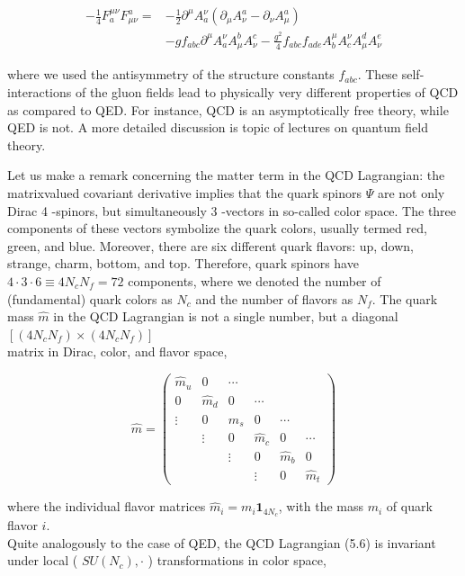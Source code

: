 \documentclass[10pt, letterpaper]{article}
\begin{document}
$$
\begin{aligned}
-\frac{1}{4} F_{a}^{\mu \nu} F_{\mu \nu}^{a}= & -\frac{1}{2} \partial^{\mu} A_{a}^{\nu}\left(\partial_{\mu} A_{\nu}^{a}-\partial_{\nu} A_{\mu}^{a}\right) \\
& -g f_{a b c} \partial^{\mu} A_{a}^{\nu} A_{\mu}^{b} A_{\nu}^{c}-\frac{g^{2}}{4} f_{a b c} f_{a d e} A_{b}^{\mu} A_{c}^{\nu} A_{\mu}^{d} A_{\nu}^{e}
\end{aligned}
$$

where we used the antisymmetry of the structure constants $f_{a b c}$. These self-interactions of the gluon fields lead to physically very different properties of QCD as compared to QED. For instance, QCD is an asymptotically free theory, while QED is not. A more detailed discussion is topic of lectures on quantum field theory.

Let us make a remark concerning the matter term in the QCD Lagrangian: the matrixvalued covariant derivative implies that the quark spinors $\Psi$ are not only Dirac 4 -spinors, but simultaneously 3 -vectors in so-called color space. The three components of these vectors symbolize the quark colors, usually termed red, green, and blue. Moreover, there are six different quark flavors: up, down, strange, charm, bottom, and top. Therefore, quark spinors have $4 \cdot 3 \cdot 6 \equiv 4 N_{c} N_{f}=72$ components, where we denoted the number of (fundamental) quark colors as $N_{c}$ and the number of flavors as $N_{f}$. The quark mass $\hat{m}$ in the QCD Lagrangian is not a single number, but a diagonal $\left[\left(4 N_{c} N_{f}\right) \times\left(4 N_{c} N_{f}\right)\right]$\\
matrix in Dirac, color, and flavor space,

$$
\hat{m}=\left(\begin{array}{cccccc}
\hat{m}_{u} & 0 & \cdots & & & \\
0 & \hat{m}_{d} & 0 & \cdots & & \\
\vdots & 0 & \hat{m}_{s} & 0 & \cdots & \\
& \vdots & 0 & \hat{m}_{c} & 0 & \cdots \\
& & \vdots & 0 & \hat{m}_{b} & 0 \\
& & & \vdots & 0 & \hat{m}_{t}
\end{array}\right)
$$

where the individual flavor matrices $\hat{m}_{i}=m_{i} \mathbf{1}_{4 N_{c}}$, with the mass $m_{i}$ of quark flavor $i$.\\
Quite analogously to the case of QED, the QCD Lagrangian (5.6) is invariant under local ( $S U\left(N_{c}\right), \cdot$ ) transformations in color space,
\end{document}
